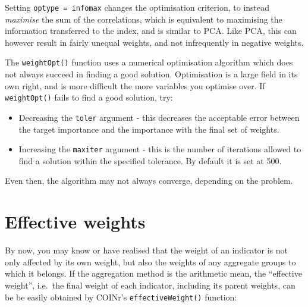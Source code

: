 \documentclass[
]{book}
\providecommand{\tightlist}{%
  \setlength{\itemsep}{0pt}\setlength{\parskip}{0pt}}
\begin{document}
Setting \texttt{optype\ =\ infomax} changes the optimisation criterion, to instead \emph{maximise} the sum of the correlations, which is equivalent to maximising the information transferred to the index, and is similar to PCA. Like PCA, this can however result in fairly unequal weights, and not infrequently in negative weights.

The \texttt{weightOpt()} function uses a numerical optimisation algorithm which does not always succeed in finding a good solution. Optimisation is a large field in its own right, and is more difficult the more variables you optimise over. If \texttt{weightOpt()} fails to find a good solution, try:

\begin{itemize}
\tightlist
\item
  Decreasing the \texttt{toler} argument - this decreases the acceptable error between the target importance and the importance with the final set of weights.
\item
  Increasing the \texttt{maxiter} argument - this is the number of iterations allowed to find a solution within the specified tolerance. By default it is set at 500.
\end{itemize}

Even then, the algorithm may not always converge, depending on the problem.

\hypertarget{effective-weights}{%
\section{Effective weights}\label{effective-weights}}

By now, you may know or have realised that the weight of an indicator is not only affected by its own weight, but also the weights of any aggregate groups to which it belongs. If the aggregation method is the arithmetic mean, the ``effective weight'', i.e.~the final weight of each indicator, including its parent weights, can be be easily obtained by COINr's \texttt{effectiveWeight()} function:
\end{document}
